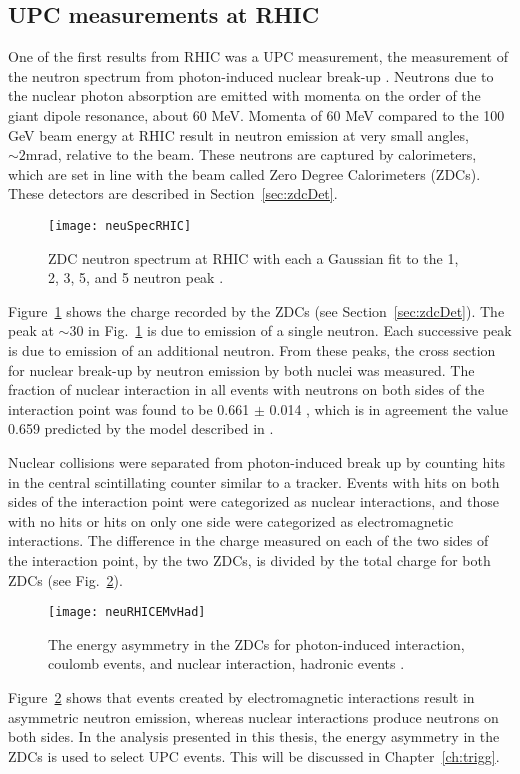   \subsection{ UPC measurements at RHIC }
    One of the first results from RHIC was a UPC measurement, the measurement of the 
      neutron spectrum from photon-induced nuclear break-up \cite{upcNeuPHENIX}.
    Neutrons due to the nuclear photon absorption are emitted with momenta on the
      order of the giant dipole resonance, about 60 MeV.
    Momenta of 60 MeV compared to the 100 GeV beam energy at RHIC result in 
      neutron emission at very small angles, $\sim 2 \textrm{mrad}$, relative to 
      the beam.
    These neutrons are captured by calorimeters, which are set in line with the 
      beam called Zero Degree Calorimeters (ZDCs).
    These detectors are described in Section~\ref{sec:zdcDet}.
    \begin{figure}[!Hhbt]
      \centering
      \texttt{[image: neuSpecRHIC]}
      \caption{ZDC neutron spectrum at RHIC with each a Gaussian fit 
         to the 1, 2, 3, 5, and 5 neutron peak \cite{upcNeuPHENIX}.}
      \label{fig:neuSpecRHIC}
    \end{figure}
    Figure~\ref{fig:neuSpecRHIC} shows the charge recorded by the ZDCs (see Section~\ref{sec:zdcDet}).
    The peak at $\sim 30$ in Fig.~\ref{fig:neuSpecRHIC} is due to emission of a 
      single neutron. 
    Each successive peak is due to emission of an additional neutron. 
    From these peaks, the cross section for nuclear break-up by neutron 
      emission by both nuclei was measured.
    The fraction of nuclear interaction in all events with neutrons on both sides
      of the interaction point was found to be 0.661 $\pm$ 0.014 \cite{upcNeuPHENIX},
      which is in agreement the value 0.659 predicted by the model described in 
      \cite{emPCite4}.

    Nuclear collisions were separated from photon-induced break up by counting
      hits in the central scintillating counter similar to a tracker. 
    Events with hits on both sides of the interaction point were categorized as
      nuclear interactions, and those with no hits or hits on only one side were
      categorized as electromagnetic interactions. 
    The difference in the charge measured on each of the two sides of the 
      interaction point, by the two ZDCs, is divided by the total charge
      for both ZDCs (see Fig.~\ref{fig:neuRHICEMvHad}).
    \begin{figure}[!Hhbt]
      \centering
      \texttt{[image: neuRHICEMvHad]}
      \caption{The energy asymmetry in the ZDCs for photon-induced interaction, 
        coulomb events, and nuclear interaction, hadronic events \cite{upcNeuPHENIX}.}
      \label{fig:neuRHICEMvHad}
    \end{figure}
    Figure~\ref{fig:neuRHICEMvHad} shows that events created by electromagnetic 
      interactions result in asymmetric neutron emission, whereas nuclear 
      interactions produce neutrons on both sides. 
    In the analysis presented in this thesis, the energy asymmetry in the ZDCs is
      used to select UPC events.
    This will be discussed in Chapter~\ref{ch:trigg}.
    
